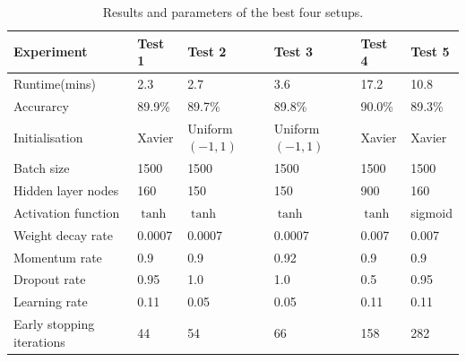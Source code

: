 \begin{table}
\caption{Results and parameters of the best four setups.}
{\footnotesize
\centering
\begin{tabular}{@{}llllll@{}}
\toprule
Experiment                & Test 1  & Test 2           & Test 3           & Test 4  & Test 5  \\ \midrule
Runtime(mins)             & 2.3     & 2.7              & 3.6              & 17.2    & 10.8    \\
Accurarcy                 & 89.9\%  & 89.7\%           & 89.8\%           & 90.0\%  & 89.3\%  \\
Initialisation            & Xavier  & Uniform$(-1,1)$ & Uniform$(-1,1)$ & Xavier  & Xavier  \\
Batch size                & 1500    & 1500             & 1500             & 1500    & 1500    \\
Hidden layer nodes        & 160     & 150              & 150              & 900     & 160     \\
Activation function       & $\tanh$ & $\tanh$          & $\tanh$          & $\tanh$ & sigmoid \\
Weight decay rate         & 0.0007  & 0.0007           & 0.0007           & 0.007   & 0.007   \\
Momentum rate             & 0.9     & 0.9              & 0.92             & 0.9     & 0.9     \\
Dropout rate              & 0.95    & 1.0              & 1.0              & 0.5     & 0.95    \\
Learning rate             & 0.11    & 0.05             & 0.05             & 0.11    & 0.11    \\
Early stopping iterations & 44      & 54               & 66               & 158     & 282     \\ \bottomrule
\end{tabular}
}
\end{table}

